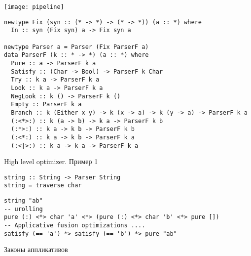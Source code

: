 
\begin{frame}{}
\texttt{[image: pipeline]}
\begin{verbatim}
newtype Fix (syn :: (* -> *) -> (* -> *)) (a :: *) where 
  In :: syn (Fix syn) a -> Fix syn a

newtype Parser a = Parser (Fix ParserF a)
data ParserF (k :: * -> *) (a :: *) where
  Pure :: a -> ParserF k a
  Satisfy :: (Char -> Bool) -> ParserF k Char
  Try :: k a -> ParserF k a
  Look :: k a -> ParserF k a
  NegLook :: k () -> ParserF k ()
  Empty :: ParserF k a
  Branch :: k (Either x y) -> k (x -> a) -> k (y -> a) -> ParserF k a
  (:<*>:) :: k (a -> b) -> k a -> ParserF k b
  (:*>:) :: k a -> k b -> ParserF k b
  (:<*:) :: k a -> k b -> ParserF k a
  (:<|>:) :: k a -> k a -> ParserF k a
\end{verbatim}
\end{frame}




\begin{frame}[fragile]{High level optimizer. Пример 1}

\begin{verbatim}
string :: String -> Parser String
string = traverse char
\end{verbatim}

\begin{verbatim}
string "ab"
-- urolling
pure (:) <*> char 'a' <*> (pure (:) <*> char 'b' <*> pure [])
-- Applicative fusion optimizations ....
satisfy (== 'a') *> satisfy (== 'b') *> pure "ab"
\end{verbatim}

\begin{block}{Законы аппликативов}
\lawApp
\end{block}
\end{frame}






